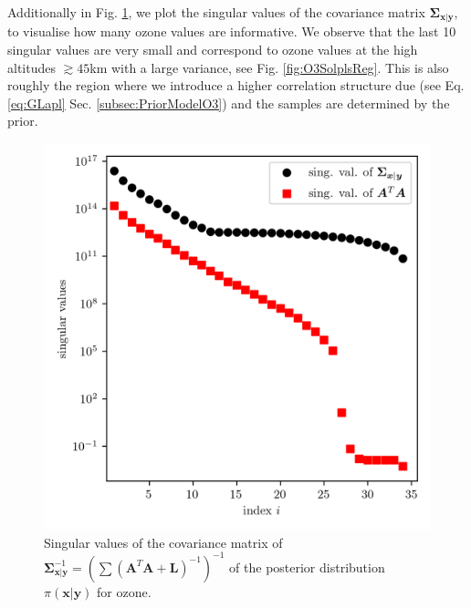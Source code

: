 Additionally in Fig. \ref{fig:PostCov}, we plot the singular values of the covariance matrix $\bm{\Sigma}_{ \bm{x}|\bm{y}}$, to visualise how many ozone values are informative.
We observe that the last 10 singular values are very small and correspond to ozone values at the high altitudes $\gtrsim 45$km with a large variance, see Fig. \ref{fig:O3SolplsReg}.
This is also roughly the region where we introduce a higher correlation structure due (see Eq. \ref{eq:GLapl} Sec. \ref{subsec:PriorModelO3}) and the samples are determined by the prior.
\begin{figure}[ht!]
	\centering
	\includegraphics{CovSing.png}
	\caption[Singular values of the posterior covariance matrix]{Singular values of the covariance matrix of $\bm{\Sigma}^{-1}_{ \bm{x}|\bm{y}} = (\sum (\bm{A}^T \bm{A} + \bm{L})^{-1})^{-1}$ of the posterior distribution $\pi(\bm{x}|\bm{y})$ for ozone.}
	\label{fig:PostCov}
\end{figure}
\clearpage


